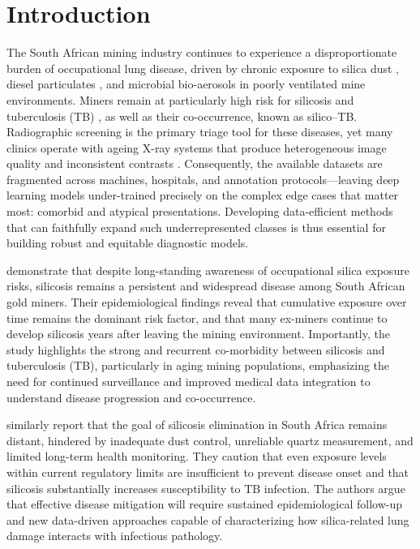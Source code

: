 \chapter{Introduction}
\label{chap:introduction}

The South African mining industry continues to experience a disproportionate burden of occupational lung disease, driven by chronic exposure to silica dust \citep{silicosis_elimination_sa_2020}, diesel particulates \citep{badenhorst2025diesel, diesel_pm_health_effects_2020}, and microbial bio-aerosols in poorly ventilated mine environments.  
Miners remain at particularly high risk for silicosis and tuberculosis (TB) \citep{silicosis_elimination_sa_2020}, as well as their co-occurrence, known as silico–TB.  
Radiographic screening is the primary triage tool for these diseases, yet many clinics operate with ageing X-ray systems that produce heterogeneous image quality and inconsistent contrasts \citep{toua2022chest, ehrlich2024silicotuberculosis}.  
Consequently, the available datasets \citep{chambon2024chexpert,nguyen2022vindr, cattamanchi2024coda} are fragmented across machines, hospitals, and annotation protocols—leaving deep learning models under-trained precisely on the complex edge cases that matter most: comorbid and atypical presentations.  
Developing data-efficient methods that can faithfully expand such underrepresented classes is thus essential for building robust and equitable diagnostic models.

\citet{predictors2020silicosis} demonstrate that despite long-standing awareness of occupational silica exposure risks, silicosis remains a persistent and widespread disease among South African gold miners. 
Their epidemiological findings reveal that cumulative exposure over time remains the dominant risk factor, and that many ex-miners continue to develop silicosis years after leaving the mining environment. 
Importantly, the study highlights the strong and recurrent co-morbidity between silicosis and tuberculosis (TB), particularly in aging mining populations, emphasizing the need for continued surveillance and improved medical data integration to understand disease progression and co-occurrence.

\citet{silicosis_elimination_sa_2020} similarly report that the goal of silicosis elimination in South Africa remains distant, hindered by inadequate dust control, unreliable quartz measurement, and limited long-term health monitoring. 
They caution that even exposure levels within current regulatory limits are insufficient to prevent disease onset and that silicosis substantially increases susceptibility to TB infection. 
The authors argue that effective disease mitigation will require sustained epidemiological follow-up and new data-driven approaches capable of characterizing how silica-related lung damage interacts with infectious pathology.

